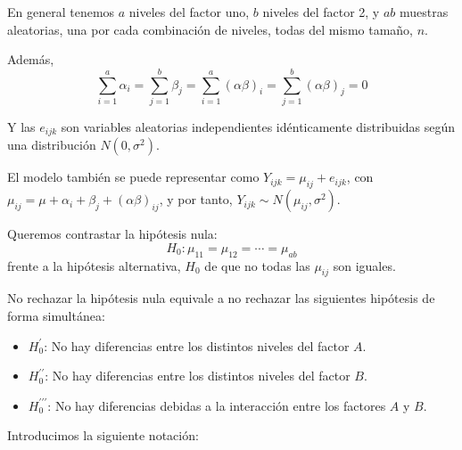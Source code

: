 En general tenemos $a$ niveles del factor uno, $b$ niveles del factor 2, y $ab$ muestras aleatorias, una por cada combinaci\'on de niveles, todas del mismo tama\~no, $n$.

Adem\'as,
\[\sum_{i=1}^a\alpha_i=\sum_{j=1}^b\beta_j=\sum_{i=1}^a(\alpha\beta)_i=\sum_{j=1}^b(\alpha\beta)_j=0\]

Y las $e_{ijk}$ son variables aleatorias independientes id\'enticamente distribuidas seg\'un una distribuci\'on $N(0,\sigma^2)$.

El modelo tambi\'en se puede representar como $Y_{ijk}=\mu_{ij}+e_{ijk}$, con $\mu_{ij}=\mu+\alpha_i+\beta_j+(\alpha\beta)_{ij}$, y por tanto, $Y_{ijk}\sim N(\mu_{ij},\sigma^2)$.

Queremos contrastar la hip\'otesis nula:
\[H_0:\mu_{11}=\mu_{12}=\cdots=\mu_{ab}\]
frente a la hip\'otesis alternativa, $H_0$ de que no todas las $\mu_{ij}$ son iguales.

No rechazar la hip\'otesis nula equivale a no rechazar las siguientes hip\'otesis de forma simult\'anea:
\begin{itemize}
\item $H_0^{\prime}$: No hay diferencias entre los distintos niveles del factor $A$.
\item $H_0^{\prime\prime}$: No hay diferencias entre los distintos niveles del factor $B$.
\item $H_0^{\prime\prime\prime}$: No hay diferencias debidas a la interacci\'on entre los factores $A$ y $B$.
\end{itemize}

Introducimos la siguiente notaci\'on:

